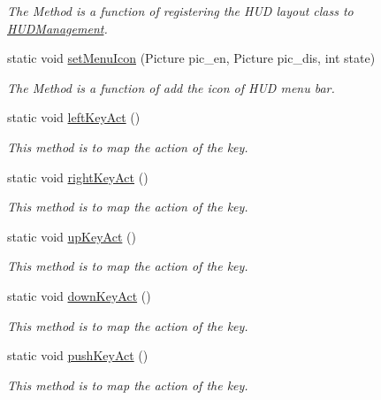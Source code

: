\begin{DoxyCompactItemize}
\begin{DoxyCompactList}\small\item\em The Method is a function of registering the H\+U\+D layout class to \hyperlink{classkr_1_1ac_1_1kookmin_1_1cs_1_1hud_1_1_h_u_d_management}{H\+U\+D\+Management}. \end{DoxyCompactList}\item 
static void \hyperlink{classkr_1_1ac_1_1kookmin_1_1cs_1_1hud_1_1_h_u_d_management_af8454651113100e20b4134f4bae1ea8e}{set\+Menu\+Icon} (Picture pic\+\_\+en, Picture pic\+\_\+dis, int state)
\begin{DoxyCompactList}\small\item\em The Method is a function of add the icon of H\+U\+D menu bar. \end{DoxyCompactList}\item 
static void \hyperlink{classkr_1_1ac_1_1kookmin_1_1cs_1_1hud_1_1_h_u_d_management_ae06e3a800da57cd4d85308ea6252617b}{left\+Key\+Act} ()
\begin{DoxyCompactList}\small\item\em This method is to map the action of the key. \end{DoxyCompactList}\item 
static void \hyperlink{classkr_1_1ac_1_1kookmin_1_1cs_1_1hud_1_1_h_u_d_management_aace7213b80851272394174ac9dc20f54}{right\+Key\+Act} ()
\begin{DoxyCompactList}\small\item\em This method is to map the action of the key. \end{DoxyCompactList}\item 
static void \hyperlink{classkr_1_1ac_1_1kookmin_1_1cs_1_1hud_1_1_h_u_d_management_a02236b52bb21cdc0b8d2408463c0a879}{up\+Key\+Act} ()
\begin{DoxyCompactList}\small\item\em This method is to map the action of the key. \end{DoxyCompactList}\item 
static void \hyperlink{classkr_1_1ac_1_1kookmin_1_1cs_1_1hud_1_1_h_u_d_management_ac1f57a7a1a845c100ef9f0edaa9167fe}{down\+Key\+Act} ()
\begin{DoxyCompactList}\small\item\em This method is to map the action of the key. \end{DoxyCompactList}\item 
static void \hyperlink{classkr_1_1ac_1_1kookmin_1_1cs_1_1hud_1_1_h_u_d_management_af416f945909ff83db9206403417e93c6}{push\+Key\+Act} ()
\begin{DoxyCompactList}\small\item\em This method is to map the action of the key. \end{DoxyCompactList}\end{DoxyCompactItemize}
